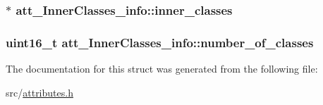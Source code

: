 \subsubsection[{\texorpdfstring{inner\+\_\+classes}{inner_classes}}]{$\ast$ att\+\_\+\+Inner\+Classes\+\_\+info\+::inner\+\_\+classes}\hypertarget{structatt__InnerClasses__info_a68beb2632952ef867172bfcfa327d256}{}\label{structatt__InnerClasses__info_a68beb2632952ef867172bfcfa327d256}
\subsubsection[{\texorpdfstring{number\+\_\+of\+\_\+classes}{number_of_classes}}]{\setlength{\rightskip}{0pt plus 5cm}uint16\+\_\+t att\+\_\+\+Inner\+Classes\+\_\+info\+::number\+\_\+of\+\_\+classes}\hypertarget{structatt__InnerClasses__info_a8bb396e50023f850c80a70e0b736cc77}{}\label{structatt__InnerClasses__info_a8bb396e50023f850c80a70e0b736cc77}


The documentation for this struct was generated from the following file\+:\begin{DoxyCompactItemize}
\item 
src/\hyperlink{attributes_8h}{attributes.\+h}\end{DoxyCompactItemize}
